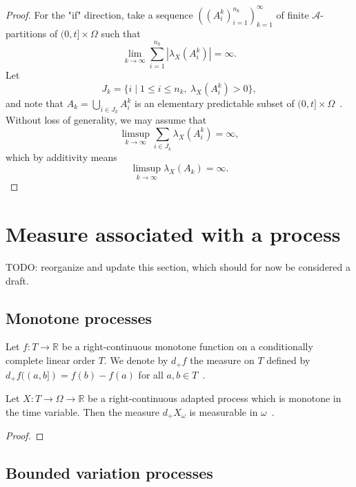 \begin{proof}
For the "if" direction, take a sequence $((A_i^k)_{i=1}^{n_k})_{k=1}^\infty$
of finite $\mathcal{A}$-partitions of $(0,t]\times\Omega$
such that
\[
  \lim_{k\to\infty}
  \sum_{i=1}^{n_k} | \lambda_X(A_i^k)|
  =\infty.
\]
Let
\[
J_k = \{i \mid 1\le i\le n_k, \: \lambda_X(A_i^k) > 0\},
\]
and note that $A_k = \bigcup_{i\in J_k} A_i^k$ is an elementary predictable
subset of $(0,t]\times\Omega$~.
Without loss of generality, we may assume that
\[
  \limsup_{k\to\infty}
  \sum_{i\in J_k} \lambda_X(A_i^k)
  =
  \infty,
\]
which by additivity means
\[
  \limsup_{k\to\infty}
  \lambda_X(A_k)
  =
  \infty.
\]
\end{proof}




\section{Measure associated with a process}

TODO: reorganize and update this section, which should for now be considered a draft.

\subsection{Monotone processes}

\begin{definition}\label{def:StieltjesFunction.measure}
  \mathlibok
Let $f : T \to \mathbb{R}$ be a right-continuous monotone function on a conditionally complete linear order $T$.
We denote by $d_+ f$ the measure on $T$ defined by $d_+ f((a, b]) = f(b) - f(a)$ for all $a, b \in T$~.
\end{definition}


\begin{lemma}\label{lem:StieltjesFunction.measurable_measure}
Let $X : T \to \Omega \to \mathbb{R}$ be a right-continuous adapted process which is monotone in the time variable.
Then the measure $d_+ X_\omega$ is measurable in $\omega$~.
\end{lemma}

\begin{proof}

\end{proof}



\subsection{Bounded variation processes}

